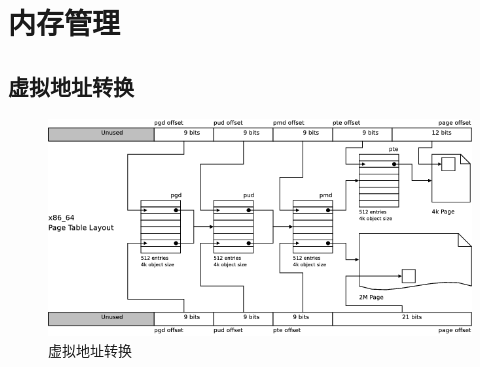 \chapter{内存管理}



\section{虚拟地址转换}


\begin{figure}[htbp]
\centering\includegraphics[width=1\textwidth]{va-to-pa.png}
\caption{虚拟地址转换\cite{linuxmm}}\label{fig:1}
\end{figure}


